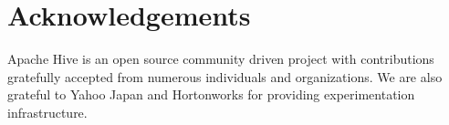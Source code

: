 \documentclass{vldb}
\begin{document}












\section*{Acknowledgements}
Apache Hive is an open source community driven project with contributions gratefully accepted from numerous individuals and organizations. 
We are also grateful to Yahoo Japan and Hortonworks for providing experimentation infrastructure. 

\balance
\small


\end{document}
